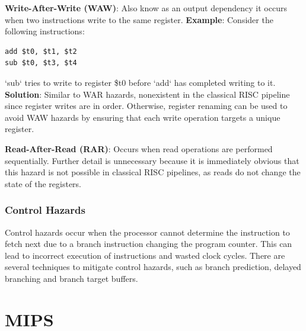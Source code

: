 \textbf{Write-After-Write (WAW)}: Also know as an output dependency it occurs when two instructions write to the same register.\newline
\textbf{Example}: Consider the following instructions:
\begin{verbatim}
add $t0, $t1, $t2
sub $t0, $t3, $t4
\end{verbatim}
`sub` tries to write to register \$t0 before `add` has completed writing to it.\newline
\textbf{Solution}: Similar to WAR hazards, nonexistent in the classical RISC pipeline since register writes are in order. Otherwise, register renaming can be used to avoid WAW hazards by ensuring that each write operation targets a unique register.

\textbf{Read-After-Read (RAR)}: Occurs when read operations are performed sequentially.\newline
Further detail is unnecessary because it is immediately obvious that this hazard is not possible in classical RISC pipelines, as reads do not change the state of the registers.



\subsubsection {Control Hazards}\label{sec:control_hazards}
Control hazards occur when the processor cannot determine the instruction to fetch next due to a branch instruction changing the program counter. This can lead to incorrect execution of instructions and wasted clock cycles. There are several techniques to mitigate control hazards, such as branch prediction, delayed branching and branch target buffers.\cite{pandey2016study}


\section {MIPS}\label{sec:mips}
